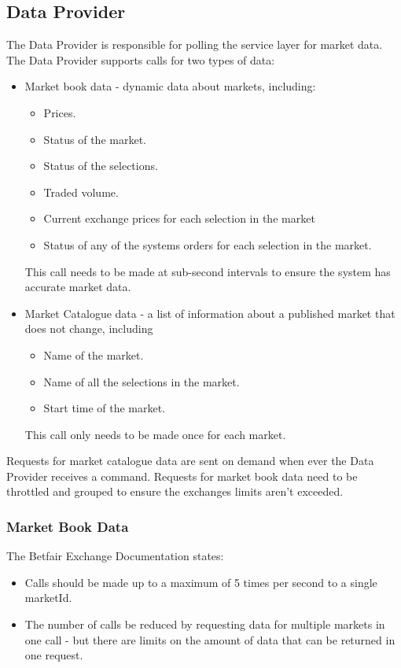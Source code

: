 	\subsection{Data Provider}
	The Data Provider is responsible for polling the service layer for market data. The Data Provider supports calls for two types of data:
		\begin{itemize}
			\item Market book data - dynamic data about markets, including:
				\begin{itemize}
					\item Prices.
					\item Status of the market.
					\item Status of the selections.
					\item Traded volume.
					\item Current exchange prices for each selection in the market
					\item Status of any of the systems orders for each selection in the market.
				\end{itemize}
				This call needs to be made at sub-second intervals to ensure the system has accurate market data.
			\item Market Catalogue data - a list of information about a published market that does not change, including
				\begin{itemize}
					\item Name of the market.
					\item Name of all the selections in the market.
					\item Start time of the market.
				\end{itemize}
				This call only needs to be made once for each market.
		\end{itemize}
	
	Requests for market catalogue data are sent on demand when ever the Data Provider receives a command. Requests for market book data need to be throttled and grouped to ensure the exchanges limits aren't exceeded.
	
	\subsubsection{Market Book Data}
	The Betfair Exchange Documentation states:
		\begin{itemize}
			\item Calls should be made up to a maximum of 5 times per second to a single marketId\cite{listMarketBook}.
			\item The number of calls be reduced by requesting data for multiple markets in one call - but there are limits on the amount of data that can be returned in one request. 
		\end{itemize}
	
